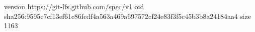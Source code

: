 version https://git-lfs.github.com/spec/v1
oid sha256:9595c7cf13ef61c86fcdf4a563a469a697572cf24e83f3f5c45b3b8a24184aa4
size 1163
